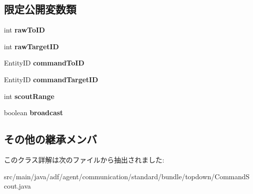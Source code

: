 \subsection*{限定公開変数類}
\begin{DoxyCompactItemize}
\item 
\hypertarget{classadf_1_1agent_1_1communication_1_1standard_1_1bundle_1_1topdown_1_1CommandScout_ab9f6f14233089a3c4c7e45aca38b0f3b}{}\label{classadf_1_1agent_1_1communication_1_1standard_1_1bundle_1_1topdown_1_1CommandScout_ab9f6f14233089a3c4c7e45aca38b0f3b} 
int {\bfseries raw\+To\+ID}
\item 
\hypertarget{classadf_1_1agent_1_1communication_1_1standard_1_1bundle_1_1topdown_1_1CommandScout_a43c3f3f5bf3e911544bee44b0e8af9d9}{}\label{classadf_1_1agent_1_1communication_1_1standard_1_1bundle_1_1topdown_1_1CommandScout_a43c3f3f5bf3e911544bee44b0e8af9d9} 
int {\bfseries raw\+Target\+ID}
\item 
\hypertarget{classadf_1_1agent_1_1communication_1_1standard_1_1bundle_1_1topdown_1_1CommandScout_acb3965fde0c0075ac3aa7d6d8e0de822}{}\label{classadf_1_1agent_1_1communication_1_1standard_1_1bundle_1_1topdown_1_1CommandScout_acb3965fde0c0075ac3aa7d6d8e0de822} 
Entity\+ID {\bfseries command\+To\+ID}
\item 
\hypertarget{classadf_1_1agent_1_1communication_1_1standard_1_1bundle_1_1topdown_1_1CommandScout_a41a75bf501fa6609537fbd04c7492b6a}{}\label{classadf_1_1agent_1_1communication_1_1standard_1_1bundle_1_1topdown_1_1CommandScout_a41a75bf501fa6609537fbd04c7492b6a} 
Entity\+ID {\bfseries command\+Target\+ID}
\item 
\hypertarget{classadf_1_1agent_1_1communication_1_1standard_1_1bundle_1_1topdown_1_1CommandScout_a136aa5156dbb9af4a8b84ca717223fca}{}\label{classadf_1_1agent_1_1communication_1_1standard_1_1bundle_1_1topdown_1_1CommandScout_a136aa5156dbb9af4a8b84ca717223fca} 
int {\bfseries scout\+Range}
\item 
\hypertarget{classadf_1_1agent_1_1communication_1_1standard_1_1bundle_1_1topdown_1_1CommandScout_a8bdefe70df15b11d6cf11dce0d752e51}{}\label{classadf_1_1agent_1_1communication_1_1standard_1_1bundle_1_1topdown_1_1CommandScout_a8bdefe70df15b11d6cf11dce0d752e51} 
boolean {\bfseries broadcast}
\end{DoxyCompactItemize}
\subsection*{その他の継承メンバ}


このクラス詳解は次のファイルから抽出されました\+:\begin{DoxyCompactItemize}
\item 
src/main/java/adf/agent/communication/standard/bundle/topdown/Command\+Scout.\+java\end{DoxyCompactItemize}
